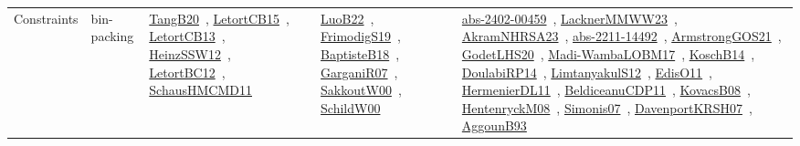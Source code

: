{\begin{longtable}{lp{3cm}>{\raggedright\arraybackslash}p{6cm}>{\raggedright\arraybackslash}p{6cm}>{\raggedright\arraybackslash}p{8cm}}
Constraints & bin-packing & \href{papers/TangB20.pdf}{TangB20}~\cite{TangB20}, \href{articles/LetortCB15.pdf}{LetortCB15}~\cite{LetortCB15}, \href{papers/LetortCB13.pdf}{LetortCB13}~\cite{LetortCB13}, \href{articles/HeinzSSW12.pdf}{HeinzSSW12}~\cite{HeinzSSW12}, \href{papers/LetortBC12.pdf}{LetortBC12}~\cite{LetortBC12}, \href{articles/SchausHMCMD11.pdf}{SchausHMCMD11}~\cite{SchausHMCMD11} & \href{papers/LuoB22.pdf}{LuoB22}~\cite{LuoB22}, \href{papers/FrimodigS19.pdf}{FrimodigS19}~\cite{FrimodigS19}, \href{articles/BaptisteB18.pdf}{BaptisteB18}~\cite{BaptisteB18}, \href{papers/GarganiR07.pdf}{GarganiR07}~\cite{GarganiR07}, \href{articles/SakkoutW00.pdf}{SakkoutW00}~\cite{SakkoutW00}, \href{articles/SchildW00.pdf}{SchildW00}~\cite{SchildW00} & \href{articles/abs-2402-00459.pdf}{abs-2402-00459}~\cite{abs-2402-00459}, \href{articles/LacknerMMWW23.pdf}{LacknerMMWW23}~\cite{LacknerMMWW23}, \href{articles/AkramNHRSA23.pdf}{AkramNHRSA23}~\cite{AkramNHRSA23}, \href{articles/abs-2211-14492.pdf}{abs-2211-14492}~\cite{abs-2211-14492}, \href{papers/ArmstrongGOS21.pdf}{ArmstrongGOS21}~\cite{ArmstrongGOS21}, \href{papers/GodetLHS20.pdf}{GodetLHS20}~\cite{GodetLHS20}, \href{papers/Madi-WambaLOBM17.pdf}{Madi-WambaLOBM17}~\cite{Madi-WambaLOBM17}, \href{papers/KoschB14.pdf}{KoschB14}~\cite{KoschB14}, \href{papers/DoulabiRP14.pdf}{DoulabiRP14}~\cite{DoulabiRP14}, \href{articles/LimtanyakulS12.pdf}{LimtanyakulS12}~\cite{LimtanyakulS12}, \href{papers/EdisO11.pdf}{EdisO11}~\cite{EdisO11}, \href{papers/HermenierDL11.pdf}{HermenierDL11}~\cite{HermenierDL11}, \href{articles/BeldiceanuCDP11.pdf}{BeldiceanuCDP11}~\cite{BeldiceanuCDP11}, \href{articles/KovacsB08.pdf}{KovacsB08}~\cite{KovacsB08}, \href{papers/HentenryckM08.pdf}{HentenryckM08}~\cite{HentenryckM08}, \href{articles/Simonis07.pdf}{Simonis07}~\cite{Simonis07}, \href{papers/DavenportKRSH07.pdf}{DavenportKRSH07}~\cite{DavenportKRSH07}, \href{articles/AggounB93.pdf}{AggounB93}~\cite{AggounB93}\\

\end{longtable}}
